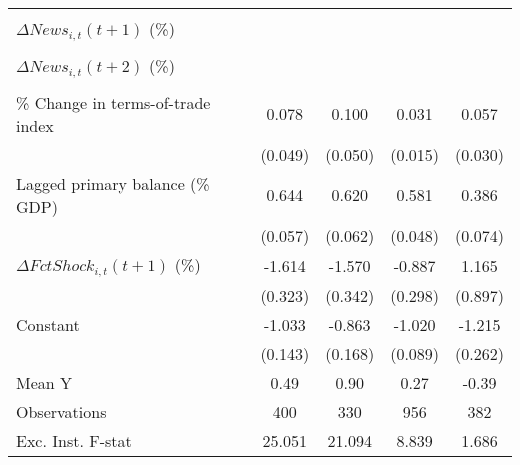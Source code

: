 {\begin{tabular}{l*{4}{c}}
                    &                     &                     &                     &                     \\
\addlinespace
$ \Delta News_{i,t}(t+1)$ (\%)&                     &                     &                     &                     \\
                    &                     &                     &                     &                     \\
\addlinespace
$ \Delta News_{i,t}(t+2)$ (\%)&                     &                     &                     &                     \\
                    &                     &                     &                     &                     \\
\addlinespace
\% Change in terms-of-trade index&       0.078         &       0.100\sym{*}  &       0.031\sym{**} &       0.057\sym{*}  \\
                    &     (0.049)         &     (0.050)         &     (0.015)         &     (0.030)         \\
\addlinespace
Lagged primary balance (\% GDP)&       0.644\sym{***}&       0.620\sym{***}&       0.581\sym{***}&       0.386\sym{***}\\
                    &     (0.057)         &     (0.062)         &     (0.048)         &     (0.074)         \\
\addlinespace
$ \Delta FctShock_{i,t}(t+1)$ (\%)&      -1.614\sym{***}&      -1.570\sym{***}&      -0.887\sym{***}&       1.165         \\
                    &     (0.323)         &     (0.342)         &     (0.298)         &     (0.897)         \\
\addlinespace
Constant            &      -1.033\sym{***}&      -0.863\sym{***}&      -1.020\sym{***}&      -1.215\sym{***}\\
                    &     (0.143)         &     (0.168)         &     (0.089)         &     (0.262)         \\
\midrule
Mean Y              &        0.49         &        0.90         &        0.27         &       -0.39         \\
Observations        &         400         &         330         &         956         &         382         \\
Exc. Inst. F-stat   &      25.051         &      21.094         &       8.839         &       1.686         \\
\bottomrule
\end{tabular}
}

